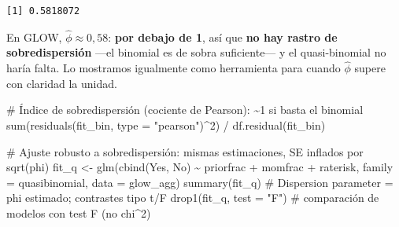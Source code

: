 \documentclass[
  letterpaper,
  DIV=11,
  numbers=noendperiod]{scrartcl}
\newenvironment{Shaded}{\begin{snugshade}}{\end{snugshade}}
\newcommand{\AttributeTok}[1]{\textcolor[rgb]{0.40,0.45,0.13}{#1}}
\newcommand{\CommentTok}[1]{\textcolor[rgb]{0.37,0.37,0.37}{#1}}
\newcommand{\DecValTok}[1]{\textcolor[rgb]{0.68,0.00,0.00}{#1}}
\newcommand{\FunctionTok}[1]{\textcolor[rgb]{0.28,0.35,0.67}{#1}}
\newcommand{\NormalTok}[1]{\textcolor[rgb]{0.00,0.23,0.31}{#1}}
\newcommand{\OtherTok}[1]{\textcolor[rgb]{0.00,0.23,0.31}{#1}}
\newcommand{\SpecialCharTok}[1]{\textcolor[rgb]{0.37,0.37,0.37}{#1}}
\newcommand{\StringTok}[1]{\textcolor[rgb]{0.13,0.47,0.30}{#1}}
\begin{document}
\begin{verbatim}
[1] 0.5818072
\end{verbatim}

En GLOW, \(\hat\phi\approx 0{,}58\): \textbf{por debajo de 1}, así que
\textbf{no hay rastro de sobredispersión} ---el binomial es de sobra
suficiente--- y el quasi-binomial no haría falta. Lo mostramos
igualmente como herramienta para cuando \(\hat\phi\) supere con claridad
la unidad.

\begin{tcolorbox}[enhanced jigsaw, breakable, colframe=quarto-callout-tip-color-frame, left=2mm, arc=.35mm, colbacktitle=quarto-callout-tip-color!10!white, toprule=.15mm, colback=white, coltitle=black, rightrule=.15mm, opacitybacktitle=0.6, title=\textcolor{quarto-callout-tip-color}{\faLightbulb}\hspace{0.5em}{🔧 En R. Sobredispersión y quasi-binomial}, titlerule=0mm, toptitle=1mm, bottomtitle=1mm, leftrule=.75mm, bottomrule=.15mm, opacityback=0]

\begin{Shaded}
\begin{Highlighting}[]
\CommentTok{\# Índice de sobredispersión (cociente de Pearson): \textasciitilde{}1 si basta el binomial}
\FunctionTok{sum}\NormalTok{(}\FunctionTok{residuals}\NormalTok{(fit\_bin, }\AttributeTok{type =} \StringTok{"pearson"}\NormalTok{)}\SpecialCharTok{\^{}}\DecValTok{2}\NormalTok{) }\SpecialCharTok{/} \FunctionTok{df.residual}\NormalTok{(fit\_bin)}

\CommentTok{\# Ajuste robusto a sobredispersión: mismas estimaciones, SE inflados por sqrt(phi)}
\NormalTok{fit\_q }\OtherTok{\textless{}{-}} \FunctionTok{glm}\NormalTok{(}\FunctionTok{cbind}\NormalTok{(Yes, No) }\SpecialCharTok{\textasciitilde{}}\NormalTok{ priorfrac }\SpecialCharTok{+}\NormalTok{ momfrac }\SpecialCharTok{+}\NormalTok{ raterisk,}
             \AttributeTok{family =}\NormalTok{ quasibinomial, }\AttributeTok{data =}\NormalTok{ glow\_agg)}
\FunctionTok{summary}\NormalTok{(fit\_q)             }\CommentTok{\# \textquotesingle{}Dispersion parameter\textquotesingle{} = phi estimado; contrastes tipo t/F}
\FunctionTok{drop1}\NormalTok{(fit\_q, }\AttributeTok{test =} \StringTok{"F"}\NormalTok{)   }\CommentTok{\# comparación de modelos con test F (no chi\^{}2)}
\end{Highlighting}
\end{Shaded}

\end{tcolorbox}
\end{document}
